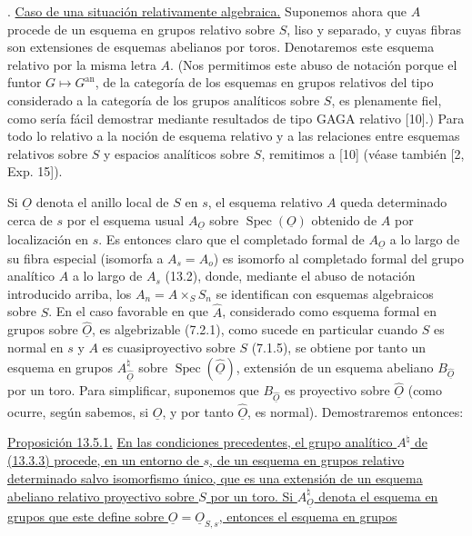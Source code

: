 \par\medskip
{}. \underline{Caso de una situación relativamente algebraica.}
Suponemos ahora que $A$ procede de un esquema en grupos relativo sobre
$S$, liso y separado, y cuyas fibras son extensiones de esquemas
abelianos por toros. Denotaremos este esquema relativo por la misma
letra $A$. (Nos permitimos este abuso de notación porque el funtor
$G\longmapsto G^{\mathrm{an}}$, de la categoría de los esquemas en
grupos relativos del tipo considerado a la categoría de los grupos
analíticos sobre $S$, es plenamente fiel, como sería fácil demostrar
mediante resultados de tipo GAGA relativo [10].) Para todo lo relativo
a la noción de esquema relativo y a las relaciones entre esquemas
relativos sobre $S$ y espacios analíticos sobre $S$, remitimos a [10]
(véase también [2, Exp. 15]).

Si $\underline O$ denota el anillo local de $S$ en $s$, el esquema
relativo $A$ queda determinado cerca de $s$ por el esquema usual
$A_{\underline O}$ sobre $\operatorname{Spec}(\underline O)$ obtenido
de $A$ por localización en $s$. Es entonces claro que el completado
formal de $A_{\underline O}$ a lo largo de su fibra especial (isomorfa
a $A_s=A_o$) es isomorfo al completado formal del grupo analítico $A$
a lo largo de $A_s$ (13.2), donde, mediante el abuso de notación
introducido arriba, los $A_n=A\times_S S_n$ se identifican con esquemas
algebraicos sobre $S$. En el caso favorable en que $\hat A$, considerado
como esquema formal en grupos sobre $\hat{\underline O}$, es
algebrizable (7.2.1), como sucede en particular cuando $S$ es normal en
$s$ y $A$ es cuasiproyectivo sobre $S$ (7.1.5), se obtiene por tanto un
esquema en grupos
$A^{\natural}_{\hat{\underline O}}$ sobre
$\operatorname{Spec}(\hat{\underline O})$, extensión de un esquema
abeliano $B_{\hat{\underline O}}$ por un toro. Para simplificar,
suponemos que $B_{\hat{\underline O}}$ es proyectivo sobre
$\hat{\underline O}$ (como ocurre, según sabemos, si $\underline O$, y
por tanto $\hat{\underline O}$, es normal). Demostraremos entonces:

\medskip
\noindent
\underline{Proposición 13.5.1.} \underline{En las condiciones
precedentes, el grupo analítico $A^{\natural}$ de (13.3.3) procede, en
un entorno de $s$, de un esquema en grupos relativo determinado salvo
isomorfismo único, que es una extensión de un esquema abeliano relativo
proyectivo sobre $S$ por un toro. Si $A^{\natural}_{\underline O}$
denota el esquema en grupos que este define sobre
$\underline O=\underline O_{S,s}$, entonces el esquema en grupos}

